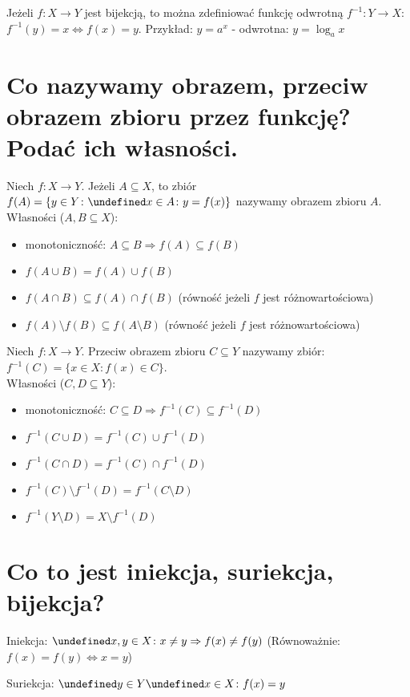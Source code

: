 \documentclass{article}
\numberwithin{equation}{section}
\theoremstyle{definition}
\theoremstyle{case}
\let\implies\Rightarrow
\let\iff\Leftrightarrow
\let\oldforall\forall
\let\forall\undefined
\DeclareMathOperator{\forall}{\mkern2mu\oldforall}
\let\oldexists\exists
\let\exists\undefined
\DeclareMathOperator{\exists}{\mkern2mu\oldexists}
\begin{document}
Jeżeli $f \colon X \to Y$ jest bijekcją, to można zdefiniować funkcję odwrotną $f^{-1} \colon Y \to X$:
${f^{-1}(y)=x \iff f(x)=y}$.
Przykład: $y=a^x$ - odwrotna: $y = \log_a{x}$

\section{Co nazywamy obrazem, przeciw obrazem zbioru przez funkcję? Podać ich własności.}
Niech $f \colon X \to Y$. Jeżeli $A \subseteq X$, to zbiór ${f(A) = \{y \in Y \colon \exists x \in A \colon y=f(x)\}}$ nazywamy obrazem zbioru $A$.
\\Własności ($A, B \subseteq X$):
\begin{itemize}
	\item monotoniczność: $A \subseteq B \implies f(A) \subseteq f(B)$
	\item $f(A \cup B) = f(A) \cup f(B)$
	\item $f(A \cap B) \subseteq f(A) \cap f(B)$ (równość jeżeli $f$ jest różnowartościowa)
	\item $f(A)\setminus f(B) \subseteq f(A \setminus B)$ (równość jeżeli $f$ jest różnowartościowa)
\end{itemize}

Niech $f \colon X \to Y$. Przeciw obrazem zbioru $C \subseteq Y$ nazywamy zbiór: ${f^{-1}(C) = \{ x \in X \colon f(x) \in C \}}$.
\\Własności ($C, D \subseteq Y$):
\begin{itemize}
	\item monotoniczność: $C \subseteq D \implies f^{-1}(C) \subseteq f^{-1}(D)$
	\item $f^{-1}(C \cup D) = f^{-1}(C) \cup f^{-1}(D)$
	\item $f^{-1}(C \cap D) = f^{-1}(C) \cap f^{-1}(D)$
	\item $f^{-1}(C) \setminus f^{-1}(D) = f^{-1}(C \setminus D)$
	\item $f^{-1}(Y \setminus D) = X \setminus f^{-1}(D)$
\end{itemize}

\section{Co to jest iniekcja, suriekcja, bijekcja?}
Iniekcja: ${\forall x,y \in X \colon x \neq y \implies f(x) \neq f(y)}$ (Równoważnie: $f(x) = f(y) \iff x = y$)

Suriekcja: ${\forall y \in Y \exists x \in X \colon f(x)=y}$
\end{document}
